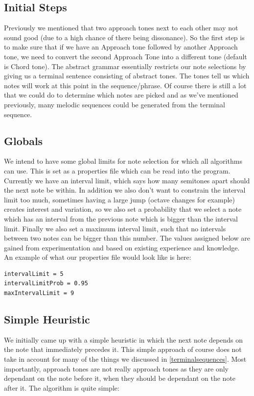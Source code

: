 \documentclass[pdftex,12pt,a4paper]{report}
\begin{document}
\subsection{Initial Steps}
Previously we mentioned that two approach tones next to each other may not sound good (due to a high chance of there being dissonance). So the first step is to make sure that if we have an Approach tone followed by another Approach tone, we need to convert the second Approach Tone into a different tone (default is Chord tone).
The abstract grammar essentially restricts our note selections by giving us a terminal sentence consisting of abstract tones. The tones tell us which notes will work at this point in the sequence/phrase. Of course there is still a lot that we could do to determine which notes are picked and as we've mentioned previously, many melodic sequences could be generated from the terminal sequence. 

\subsection{Globals}
We intend to have some global limits for note selection for which all algorithms can use. This is set as a properties file which can be read into the program. Currently we have an interval limit, which says how many semitones apart should the next note be within. In addition we also don't want to constrain the interval limit too much, sometimes having a large jump (octave changes for example) creates interest and variation, so we also set a probability that we select a note which has an interval from the previous note which is bigger than the interval limit. Finally we also set a maximum interval limit, such that no intervals between two notes can be bigger than this number. The values assigned below are gained from experimentation and based on existing experience and knowledge. An example of what our properties file would look like is here:

\begin{verbatim}
intervalLimit = 5
intervalLimitProb = 0.95
maxIntervalLimit = 9
\end{verbatim}

\subsection{Simple Heuristic}
We initially came up with a simple heuristic in which the next note depends on the note that immediately precedes it. This simple approach of course does not take in account for many of the things we discussed in \ref{terminalsequences}. Most importantly, approach tones are not really approach tones as they are only dependant on the note before it, when they should be dependant on the note after it.
The algorithm is quite simple:
\end{document}
